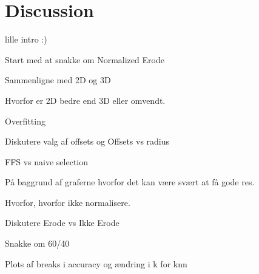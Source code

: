 \chapter{Discussion}

lille intro :)

Start med at snakke om Normalized Erode

Sammenligne med 2D og 3D

Hvorfor er 2D bedre end 3D eller omvendt.

Overfitting

Diskutere valg af offsets og Offsets vs radius

FFS vs naive selection

På baggrund af graferne hvorfor det kan være svært at få gode res.

Hvorfor, hvorfor ikke normalisere.

Diskutere Erode vs Ikke Erode

Snakke om 60/40

Plots af breaks i accuracy og ændring i k for knn